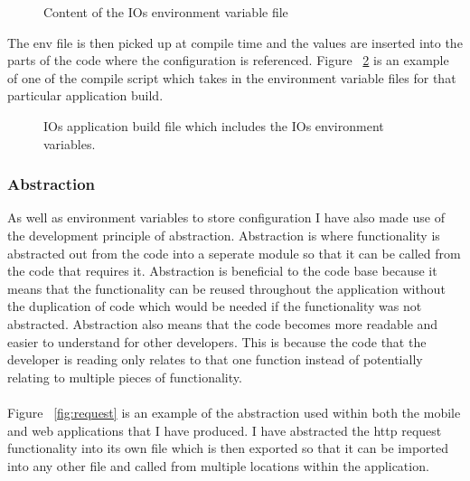 \documentclass[a4paper,11pt]{report}
\begin{document}
\begin{figure}[H]
    \centering
    \caption{Content of the IOs environment variable file}
    \label{fig:iosVars}
\end{figure}

The env file is then picked up at compile time and the values are inserted into the parts of the code where the configuration is referenced. Figure ~\ref{fig:iosScript} is an example of one of the compile script which takes in the environment variable files for that particular application build.
\begin{figure}[H]
    \centering
    \caption{IOs application build file which includes the IOs environment variables.}
    \label{fig:iosScript}
\end{figure}

\subsubsection{Abstraction}
As well as environment variables to store configuration I have also made use of the development principle of abstraction.
Abstraction is where functionality is abstracted out from the code into a seperate module so that it can be called from
the code that requires it. Abstraction is beneficial to the code base because it means that the functionality can be reused
throughout the application without the duplication of code which would be needed if the functionality was not abstracted.
Abstraction also means that the code becomes more readable and easier to understand for other developers. 
This is because the code that the developer is reading only relates to that one function instead of potentially 
relating to multiple pieces of functionality.
\\
\\
 Figure ~\ref{fig:request} is an example of the abstraction used within both
the mobile and web applications that I have produced. I have abstracted the http request functionality into its own file 
which is then exported so that it can be imported into any other file and called from multiple locations within the application.
\end{document}
